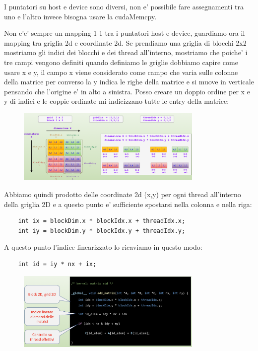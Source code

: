 I puntatori su host e device sono diversi, non e' possibile fare assegnamenti tra uno e l'altro invece bisogna usare la cudaMemcpy.

Non c'e' sempre un mapping 1-1 tra i puntatori host e device, guardiamo ora il mapping tra griglia 2d e coordinate 2d.
Se prendiamo una griglia di blocchi 2x2 mostriamo gli indici dei blocchi e dei thread all'interno, mostriamo che poiche' i tre campi vengono definiti quando definiamo le griglie dobbiamo capire come usare x e y, il campo x viene considerato come campo che varia sulle colonne della matrice per converso la y indica le righe della matrice e si muove in verticale pensando che l'origine e' in alto a sinistra. Posso creare un doppio ordine per x e y di indici e le coppie ordinate mi indicizzano tutte le entry della matrice:

\begin{figure}[ht!]
    \centering
    \includegraphics[width=0.8\textwidth]{images/grid2d.png}
\end{figure}

Abbiamo quindi prodotto delle coordinate 2d (x,y) per ogni thread all'interno della griglia 2D e a questo punto e' sufficiente spostarsi nella colonna e nella riga:
\begin{lstlisting}
    int ix = blockDim.x * blockIdx.x + threadIdx.x;
    int iy = blockDim.y * blockIdx.y + threadIdx.y;
\end{lstlisting}
A questo punto l'indice linearizzato lo ricaviamo in questo modo:
\begin{lstlisting}
    int id = iy * nx + ix;
\end{lstlisting}

\begin{figure}[ht!]
    \centering
    \includegraphics[width=0.8\textwidth]{images/sommaMatriciKernel.png}
\end{figure}

